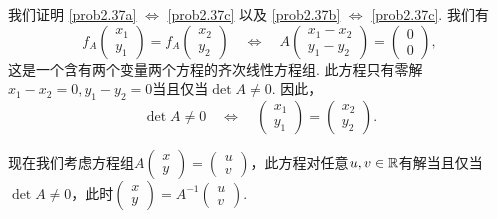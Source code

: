 \begin{solution}
  我们证明 \ref{prob2.37a} $\Leftrightarrow$ \ref{prob2.37c} 以及 \ref{prob2.37b} $\Leftrightarrow$ \ref{prob2.37c}. 我们有
  \[
    f_A\begin{pmatrix}
      x_1 \\ y_1
    \end{pmatrix} = f_A\begin{pmatrix}
      x_2 \\ y_2
    \end{pmatrix}\quad \Leftrightarrow \quad
    A \begin{pmatrix}
      x_1 - x_2 \\
      y_1 - y_2
    \end{pmatrix} = \begin{pmatrix}
      0 \\ 0
    \end{pmatrix},
  \]
  这是一个含有两个变量两个方程的齐次线性方程组. 此方程只有零解$x_1-x_2=0,y_1-y_2=0$当且仅当$\det A\ne0$. 因此，
  \[
    \det A \ne 0 \quad \Leftrightarrow \quad
    \begin{pmatrix}
      x_1 \\ y_1
    \end{pmatrix} = \begin{pmatrix}
      x_2 \\ y_2
    \end{pmatrix}.
  \]

  现在我们考虑方程组$A\begin{pmatrix}
    x \\ y
  \end{pmatrix}=\begin{pmatrix}
    u \\ v
  \end{pmatrix}$，此方程对任意$u,v\in\mathbb R$有解当且仅当$\det A\ne0$，此时$\begin{pmatrix}
    x \\ y
  \end{pmatrix}=A^{-1}\begin{pmatrix}
    u \\ v
  \end{pmatrix}$.
\end{solution}

